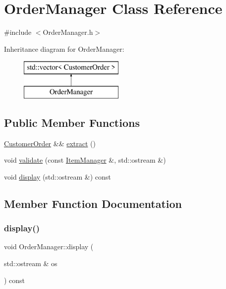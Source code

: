 \hypertarget{class_order_manager}{}\section{Order\+Manager Class Reference}
\label{class_order_manager}


{\ttfamily \#include $<$Order\+Manager.\+h$>$}

Inheritance diagram for Order\+Manager\+:\begin{figure}[H]
\begin{center}
\leavevmode
\includegraphics[height=2.000000cm]{class_order_manager}
\end{center}
\end{figure}
\subsection*{Public Member Functions}
\begin{DoxyCompactItemize}
\item 
\mbox{\hyperlink{class_customer_order}{Customer\+Order}} \&\& \mbox{\hyperlink{class_order_manager_a2111b67d23078421bb0c012c25ee87f1}{extract}} ()
\item 
void \mbox{\hyperlink{class_order_manager_a5469cae831246813134630f8bd85db79}{validate}} (const \mbox{\hyperlink{class_item_manager}{Item\+Manager}} \&, std\+::ostream \&)
\item 
void \mbox{\hyperlink{class_order_manager_a01ff4be0afbb0535de41d5caedcf0016}{display}} (std\+::ostream \&) const
\end{DoxyCompactItemize}


\subsection{Member Function Documentation}
\mbox{\label{class_order_manager_a01ff4be0afbb0535de41d5caedcf0016}} 
\subsubsection{\texorpdfstring{display()}{display()}}
{\footnotesize\ttfamily void Order\+Manager\+::display (\begin{DoxyParamCaption}\item[{std\+::ostream \&}]{os }\end{DoxyParamCaption}) const}

